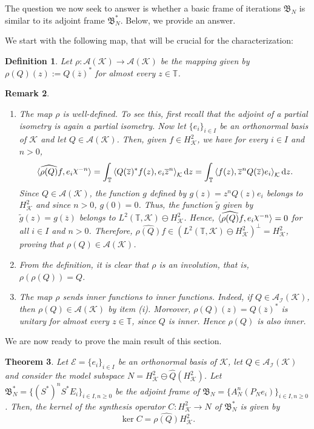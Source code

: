 \documentclass[a4paper,12pt]{amsart}
\def\cA{{\mathcal{A}}}
\def\d{\,{\mathrm{d}}}
\def\cI{{\mathcal{I}}}
\def\KK{{\mathcal{K}}}
\def\T{{\mathbb{T}}}
\DeclareRobustCommand{\rchi}{{\mathpalette\irchi\relax}}
\newcommand{\irchi}[2]{\raisebox{\depth}{$#1\chi$}} %
\newcommand{\scal}[1]{{\langle{#1}\rangle}}
\newtheorem{theorem}{Theorem}[section]
\newtheorem{definition}[theorem]{Definition}
\newtheorem{remark}[theorem]{Remark}
\theoremstyle{definition}
\begin{document}
The question we now seek to answer is whether a basic frame of iterations $\mathfrak{B}_N$ is similar to its adjoint frame $\mathfrak{B}_N^*.$
Below, we provide an answer. 

We start with the following map, that will be crucial for the characterization:

\begin{definition}
Let $\rho:\cA(\KK)\to\cA(\KK)$ be the mapping given by $\rho(Q)(z):=Q(\overline{z})^*$ for almost every $z\in\T$. 
\end{definition}

\begin{remark}\label{rem:coeficiente-involucion}
\noindent
\begin{enumerate}[label=(\roman*),ref=(\roman*)]
\item The map $\rho$ is well-defined. To see this, first recall that the adjoint of a partial isometry is again a partial isometry. Now let $\{e_i\}_{i\in I}$ be an orthonormal basis of $\KK$ and let $Q\in\cA(\KK)$. Then, given $f\in H^2_\KK$, we have for every $i\in I$ and $n>0$,
$$
\scal{\widehat{\rho(Q)}f,e_i\rchi^{-n}}=\int_\T\scal{Q(\overline{z})^*f(z),e_i\overline{z}^n}_\KK\d z
=\int_\T\scal{f(z),\overline{z}^nQ(\overline{z})e_i}_\KK\d z.
$$
Since $Q\in\cA(\KK)$, the function  $g$ defined by $g(z)=z^nQ(z)e_i$  belongs to  $H^2_\KK$ and since $n>0$, $g(0)=0$. Thus, the function $\tilde g$ given  by $\tilde g(z)= g(\overline{z})$ belongs to $ L^2(\T,\KK)\ominus H^2_\KK$. Hence, $\scal{\widehat{\rho(Q)}f,e_i\rchi^{-n}}=0$ for all $i\in I$ and $n>0$.  Therefore, $\widehat{\rho(Q)}f\in( L^2(\T,\KK)\ominus H^2_\KK)^\perp=H^2_\KK$, proving that $\rho(Q)\in \cA(\KK)$.


\item From the definition, it is clear that $\rho$ is an involution, that is, $\rho(\rho(Q))=Q$.

\item 
The map $\rho$ sends inner functions to inner functions. Indeed, if
$Q\in\cA_\cI(\KK)$, then $\rho(Q)\in\cA(\KK)$ by item (i). Moreover,
$
\rho(Q)(z)=Q(\overline z)^*
$
is unitary for almost every $z\in\T$, since $Q$ is inner. Hence $\rho(Q)$ is also inner.

\end{enumerate}
\end{remark}

We are now ready to prove the main result of this section.


\begin{theorem}\label{kerC_frameS*}
Let $\mathcal E=\{e_i\}_{i\in I}$ be an orthonormal basis of $\KK$, let $Q\in\cA_\cI(\KK)$ and consider the model subspace $N=H^2_\KK\ominus\widehat{Q}(H^2_\KK)$. Let $\mathfrak{B}_N^*=\{(S^*)^nS^*E_i\}_{i\in I,n\geqslant0}$ be the adjoint frame of $\mathfrak{B}_N=\{A_N^n(P_Ne_i)\}_{i\in I,n\geqslant0}$. Then, the kernel of the synthesis operator $C:H^{2}_{\KK}\to N$ of $\mathfrak{B}_N^*$ is given by
\begin{equation*}
\ker C =\widehat{\rho(Q)}H^2_\KK.
\end{equation*}
\end{theorem}
\end{document}
